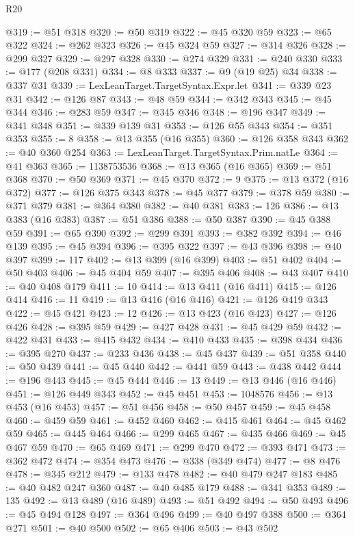 \begin{lexlean}{R20}
\begin{coremodule}
@319 := @51 @318
@320 := @50 @319
@322 := @45 @320 @59
@323 := @65 @322
@324 := @262 @323
@326 := @45 @324 @59
@327 := @314 @326
@328 := @299 @327
@329 := @297 @328
@330 := @274 @329
@331 := @240 @330
@333 := @177 (@208 @331)
@334 := @8 @333
@337 := @9 (@19 @25) @34
@338 := @337 @31
@339 := LexLeanTarget.TargetSyntax.Expr.let
@341 := @339 @23 @31
@342 := @126 @87
@343 := @48 @59
@344 := @342 @343
@345 := @45 @344
@346 := @283 @59
@347 := @345 @346
@348 := @196 @347
@349 := @341 @348
@351 := @339 @139 @31
@353 := @126 @55 @343
@354 := @351 @353
@355 := 8
@358 := @13 @355 (@16 @355)
@360 := @126 @358 @343
@362 := @40 @360 @254
@363 := LexLeanTarget.TargetSyntax.Prim.natLe
@364 := @41 @363
@365 := 1138753536
@368 := @13 @365 (@16 @365)
@369 := @51 @368
@370 := @50 @369
@371 := @45 @370
@372 := 9
@375 := @13 @372 (@16 @372)
@377 := @126 @375 @343
@378 := @45 @377
@379 := @378 @59
@380 := @371 @379
@381 := @364 @380
@382 := @40 @381
@383 := 126
@386 := @13 @383 (@16 @383)
@387 := @51 @386
@388 := @50 @387
@390 := @45 @388 @59
@391 := @65 @390
@392 := @299 @391
@393 := @382 @392
@394 := @46 @139
@395 := @45 @394
@396 := @395 @322
@397 := @43 @396
@398 := @40 @397
@399 := 117
@402 := @13 @399 (@16 @399)
@403 := @51 @402
@404 := @50 @403
@406 := @45 @404 @59
@407 := @395 @406
@408 := @43 @407
@410 := @40 @408 @179
@411 := 10
@414 := @13 @411 (@16 @411)
@415 := @126 @414
@416 := 11
@419 := @13 @416 (@16 @416)
@421 := @126 @419 @343
@422 := @45 @421
@423 := 12
@426 := @13 @423 (@16 @423)
@427 := @126 @426
@428 := @395 @59
@429 := @427 @428
@431 := @45 @429 @59
@432 := @422 @431
@433 := @415 @432
@434 := @410 @433
@435 := @398 @434
@436 := @395 @270
@437 := @233 @436
@438 := @45 @437
@439 := @51 @358
@440 := @50 @439
@441 := @45 @440
@442 := @441 @59
@443 := @438 @442
@444 := @196 @443
@445 := @45 @444
@446 := 13
@449 := @13 @446 (@16 @446)
@451 := @126 @449 @343
@452 := @45 @451
@453 := 1048576
@456 := @13 @453 (@16 @453)
@457 := @51 @456
@458 := @50 @457
@459 := @45 @458
@460 := @459 @59
@461 := @452 @460
@462 := @415 @461
@464 := @45 @462 @59
@465 := @445 @464
@466 := @299 @465
@467 := @435 @466
@469 := @45 @467 @59
@470 := @65 @469
@471 := @299 @470
@472 := @393 @471
@473 := @362 @472
@474 := @354 @473
@476 := @338 (@349 @474)
@477 := @8 @476
@478 := @345 @212
@479 := @133 @478
@482 := @40 @479 @247 @183
@485 := @40 @482 @247 @360
@487 := @40 @485 @179
@488 := @341 @353
@489 := 135
@492 := @13 @489 (@16 @489)
@493 := @51 @492
@494 := @50 @493
@496 := @45 @494 @128
@497 := @364 @496
@499 := @40 @497 @388
@500 := @364 @271
@501 := @40 @500
@502 := @65 @406
@503 := @43 @502

\end{coremodule}
\end{lexlean}

